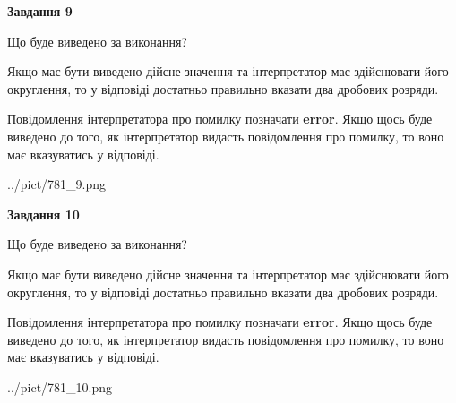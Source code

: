 \documentclass[12pt, ukrainian]{article}
\begin{document}
{\begin {Large}
{\begin {center}\textbf{Завдання 9}\end {center}}\par
Що буде виведено за виконання? \par

Якщо має бути виведено дійсне значення та інтерпретатор має здійснювати його округлення, 
то у відповіді достатньо правильно вказати два дробових розряди.

Повідомлення інтерпретатора про помилку позначати \textbf{error}.
Якщо щось буде виведено до того, як інтерпретатор видасть повідомлення про помилку, 
то воно має вказуватись у відповіді. \par

\begin{center}
	{../pict/781_9.png}
\end{center}
\newpage

{\begin {center}\textbf{Завдання 10}\end {center}}\par
Що буде виведено за виконання? \par

Якщо має бути виведено дійсне значення та інтерпретатор має здійснювати його округлення, 
то у відповіді достатньо правильно вказати два дробових розряди.

Повідомлення інтерпретатора про помилку позначати \textbf{error}.
Якщо щось буде виведено до того, як інтерпретатор видасть повідомлення про помилку, 
то воно має вказуватись у відповіді. \par

\begin{center}
	{../pict/781_10.png}
\end{center}
\newpage

\end {Large}}
\end{document}
